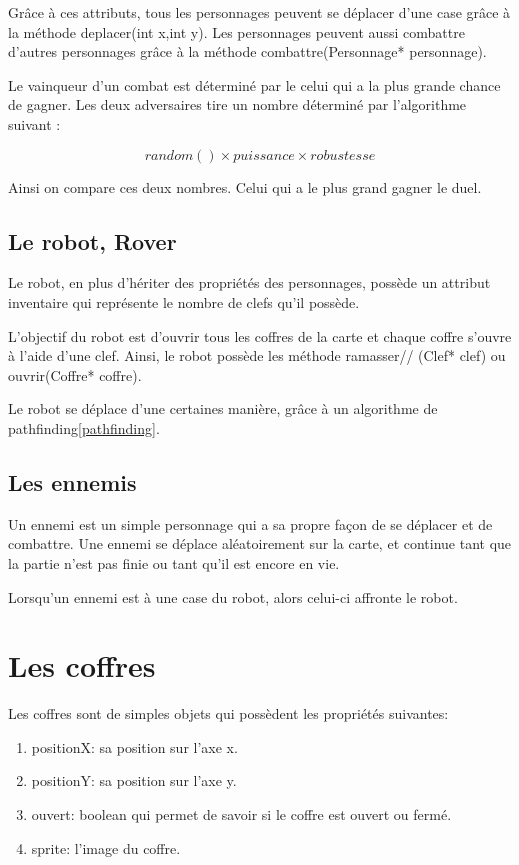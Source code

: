 \documentclass[a4paper 12pts]{article}
\begin{document}
Grâce à ces attributs, tous les personnages peuvent se déplacer d'une case grâce à la méthode deplacer(int x,int y). Les personnages peuvent aussi combattre d'autres personnages grâce à la méthode combattre(Personnage* personnage).

Le vainqueur d'un combat est déterminé par le celui qui a la plus grande chance de gagner. Les deux adversaires tire un nombre déterminé par l'algorithme suivant :

\begin{equation}
    random() \times puissance \times robustesse 
    \label{combat}
\end{equation}

Ainsi on compare ces deux nombres. Celui qui a le plus grand gagner le duel.

\subsection{Le robot, Rover}

Le robot, en plus d'hériter des propriétés des personnages, possède un attribut inventaire qui représente le nombre de clefs qu'il possède.

L'objectif du robot est d'ouvrir tous les coffres de la carte et chaque coffre s'ouvre à l'aide d'une clef. Ainsi, le robot possède les méthode ramasser//
(Clef* clef) ou ouvrir(Coffre* coffre).

Le robot se déplace d'une certaines manière, grâce à un algorithme de pathfinding\ref{pathfinding}.

\subsection{Les ennemis}

Un ennemi est un simple personnage qui a sa propre façon de se déplacer et de combattre. 
Une ennemi se déplace aléatoirement sur la carte, et continue tant que la partie n'est pas finie ou tant qu'il est encore en vie.

Lorsqu'un ennemi est à une case du robot, alors celui-ci affronte le robot.


\section{Les coffres}

Les coffres sont de simples objets qui possèdent les propriétés suivantes: 

\begin{enumerate}
	\item positionX: sa position sur l'axe x.
	\item positionY: sa position sur l'axe y. 
	\item ouvert: boolean qui permet de savoir si le coffre est ouvert ou fermé.
	\item sprite: l'image du coffre.
\end{enumerate}
\end{document}

